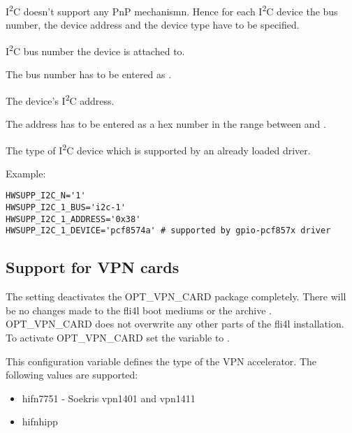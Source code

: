 \begin{description}
  I\textsuperscript{2}C doesn't support any PnP mechanismn.
  Hence for each I\textsuperscript{2}C device the bus number,
  the device address and the device type have to be specified.

  I\textsuperscript{2}C bus number the device is attached to.

  The bus number has to be entered as .

  The device's I\textsuperscript{2}C address.

  The address has to be entered as a hex number in the range between  and .

  The type of I\textsuperscript{2}C device which is supported by an already
  loaded driver.

Example:
\begin{verbatim}
HWSUPP_I2C_N='1'
HWSUPP_I2C_1_BUS='i2c-1'
HWSUPP_I2C_1_ADDRESS='0x38'
HWSUPP_I2C_1_DEVICE='pcf8574a' # supported by gpio-pcf857x driver
\end{verbatim}

\subsection {Support for VPN cards}

  The setting  deactivates the OPT\_VPN\_CARD package completely. There
  will be no changes made to the fli4l boot mediums or the archive .
  OPT\_VPN\_CARD does not overwrite any other parts of the fli4l installation.
  To activate OPT\_VPN\_CARD set the variable  to .


  This configuration variable defines the type of the VPN accelerator.
  The following values are supported:
  \begin{itemize}
    \item hifn7751 - Soekris vpn1401 and vpn1411
    \item hifnhipp
  \end{itemize}

\end{description}
